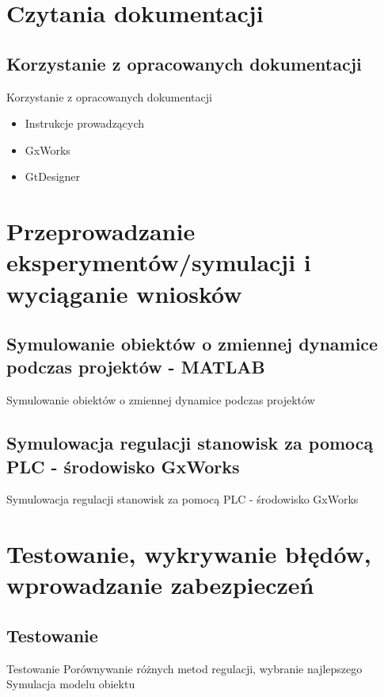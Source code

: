 \documentclass{beamer}
\begin{document}
\section{Czytania dokumentacji}

	\subsection{Korzystanie z opracowanych dokumentacji}
	\begin{frame}{Korzystanie z opracowanych dokumentacji}
		\begin{itemize}
			\item Instrukcje prowadzących
			\item GxWorks
			\item GtDesigner
		\end{itemize}
	\end{frame}

\section{Przeprowadzanie eksperymentów/symulacji i wyciąganie wniosków}

	\subsection{Symulowanie obiektów o zmiennej dynamice podczas projektów - MATLAB}
	\begin{frame}{Symulowanie obiektów o zmiennej dynamice podczas projektów}
		
	\end{frame}
	
	\subsection{Symulowacja regulacji stanowisk za pomocą PLC - środowisko GxWorks}
	\begin{frame}{Symulowacja regulacji stanowisk za pomocą PLC - środowisko GxWorks}
		
	\end{frame}

\section{Testowanie, wykrywanie błędów, wprowadzanie zabezpieczeń}

	\subsection{Testowanie}
	\begin{frame}{Testowanie}
		Porównywanie różnych metod regulacji, wybranie najlepszego
		Symulacja modelu obiektu
	\end{frame}
	
\end{document}
